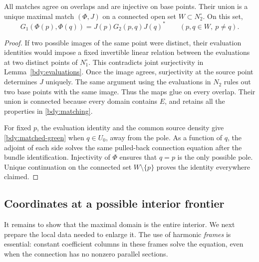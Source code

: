 \begin{lemma}\label{bdy:matches}
All matches agree on overlaps and are injective on base points.
Their union is a unique maximal match \((\Phi,J)\) on a connected
open set \(W\subset N_2^\circ\).  On this set,
\begin{equation}\label{bdy:matched-green}
 G_1(\Phi(p),\Phi(q))
       =J(p)G_2(p,q)J(q)^*\qquad(p,q\in W,\ p\ne q).
\end{equation}
\end{lemma}

\begin{proof}
If two possible images of the same point were distinct, their
evaluation identities would impose a fixed invertible linear
relation between the evaluations at two distinct points of
\(N_1^\circ\).  This contradicts joint surjectivity in
Lemma~\ref{bdy:evaluations}.  Once the image agrees, surjectivity
at the source point determines \(J\) uniquely.  The same argument
using the evaluations in \(N_2\) rules out two base points with
the same image.  Thus the maps glue on every overlap.  Their
union is connected because every domain contains \(E\), and
retains all the properties in \eqref{bdy:matching}.

For fixed \(p\), the evaluation identity and the common source
density give \eqref{bdy:matched-green} when \(q\in U_0\), away
from the pole.  As a function of \(q\), the adjoint of each side
solves the same pulled-back connection equation after the bundle
identification.  Injectivity of \(\Phi\) ensures that \(q=p\)
is the only possible pole.  Unique continuation on the connected
set \(W\setminus\{p\}\) proves the identity everywhere claimed.
\end{proof}

\subsection{Coordinates at a possible interior frontier}

It remains to show that the maximal domain is the entire interior.
We next prepare the local data needed to enlarge it.  The use of
harmonic \emph{frames} is essential: constant coefficient columns
in these frames solve the equation, even when the connection has
no nonzero parallel sections.


